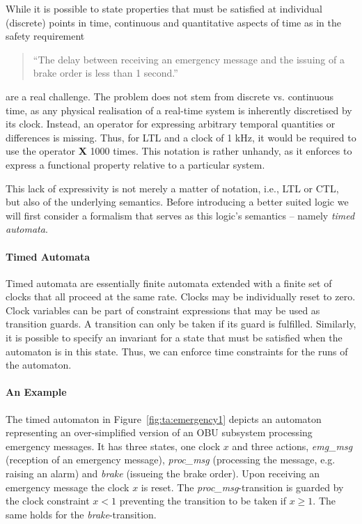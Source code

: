 While it is possible to state properties that must be satisfied at
individual (discrete) points in time, continuous and quantitative
aspects of time as in the safety requirement
\begin{quote}
``The delay between receiving an emergency message and the issuing of
a brake order is less than 1 second.''
\end{quote}
are a real challenge. The problem does not stem from discrete
vs. continuous time, as any physical realisation of a real-time system
is inherently discretised by its clock. Instead, an operator for
expressing arbitrary temporal quantities or differences is
missing. Thus, for LTL and a clock of 1 kHz, it would be required to
use the operator \textbf{X} 1000 times. This notation is rather
unhandy, as it enforces to express a functional property relative to a
particular system.


This lack of expressivity is not merely a matter of notation, i.e.,
LTL or CTL, but also of the underlying semantics. Before introducing a
better suited logic we will first consider a formalism that serves as
this logic's semantics -- namely \emph{timed automata}.

\paragraph{Timed Automata}

Timed automata \cite{Alur1994} are essentially finite automata
extended with a finite set of clocks that all proceed at the same
rate. Clocks may be individually reset to zero. Clock variables can be
part of constraint expressions that may be used as transition
guards. A transition can only be taken if its guard is
fulfilled. Similarly, it is possible to specify an invariant for a
state that must be satisfied when the automaton is in this
state. Thus, we can enforce time constraints for the runs of the
automaton.

\paragraph{An Example}
The timed automaton in Figure~\ref{fig:ta:emergency1} depicts an
automaton representing an over-simplified version of an OBU subsystem
processing emergency messages. It has three states, one clock $x$ and
three actions, \textit{emg\_msg} (reception of an emergency message),
\textit{proc\_msg} (processing the message, e.g. raising an alarm) and
\textit{brake} (issueing the brake order). Upon receiving an emergency
message the clock $x$ is reset. The \textit{proc\_msg}-transition is
guarded by the clock constraint $x<1$ preventing the transition to be
taken if $x\geq 1$. The same holds for the \textit{brake}-transition.

